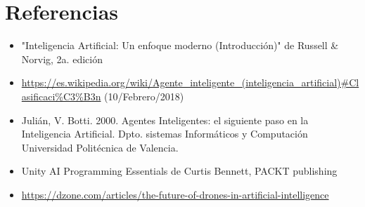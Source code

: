 \documentclass[12pt]{article}
\begin{document}
\section{Referencias}

\begin{itemize}
    \item "Inteligencia Artificial: Un enfoque moderno (Introducción)" de Russell \& Norvig, 2a. edición
    \item \url{https://es.wikipedia.org/wiki/Agente_inteligente_(inteligencia_artificial)#Clasificaci%C3%B3n} (10/Febrero/2018)
    \item Julián, V. Botti. 2000. Agentes Inteligentes: el siguiente paso en la Inteligencia Artificial. Dpto.
sistemas Informáticos y Computación Universidad Politécnica de Valencia.
    \item Unity AI Programming Essentials de Curtis Bennett, PACKT publishing
    \item \url{https://dzone.com/articles/the-future-of-drones-in-artificial-intelligence}
\end{itemize}
\end{document}
